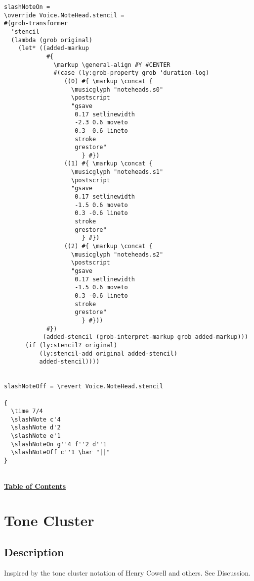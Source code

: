 \begin{verbatim}
slashNoteOn =
\override Voice.NoteHead.stencil =
#(grob-transformer
  'stencil
  (lambda (grob original)
    (let* ((added-markup
            #{
              \markup \general-align #Y #CENTER
              #(case (ly:grob-property grob 'duration-log)
                 ((0) #{ \markup \concat {
                   \musicglyph "noteheads.s0"
                   \postscript
                   "gsave 
                    0.17 setlinewidth 
                    -2.3 0.6 moveto 
                    0.3 -0.6 lineto
                    stroke 
                    grestore"
                      } #})
                 ((1) #{ \markup \concat {
                   \musicglyph "noteheads.s1"
                   \postscript
                   "gsave 
                    0.17 setlinewidth 
                    -1.5 0.6 moveto 
                    0.3 -0.6 lineto
                    stroke 
                    grestore"
                      } #})
                 ((2) #{ \markup \concat {
                   \musicglyph "noteheads.s2"
                   \postscript
                   "gsave 
                    0.17 setlinewidth 
                    -1.5 0.6 moveto 
                    0.3 -0.6 lineto
                    stroke 
                    grestore"
                      } #}))
            #})
           (added-stencil (grob-interpret-markup grob added-markup)))
      (if (ly:stencil? original)
          (ly:stencil-add original added-stencil)
          added-stencil))))


slashNoteOff = \revert Voice.NoteHead.stencil

{
  \time 7/4
  \slashNote c'4
  \slashNote d'2
  \slashNote e'1
  \slashNoteOn g''4 f''2 d''1
  \slashNoteOff c''1 \bar "||"
}
\end{verbatim}
\hyperref[sec:toc]{\\ \textbf{Table of Contents}}

\vfill \break



\section {Tone Cluster}
\hfill
\subsection{Description}
Inspired by the tone cluster notation of Henry Cowell and others. See Discussion.

